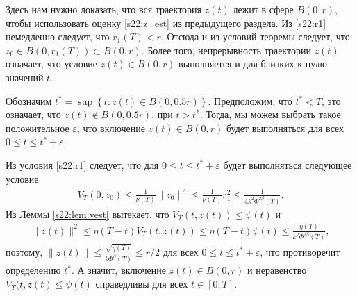 \documentclass[../main.tex]{subfiles}
\begin{document}
Здесь нам нужно доказать, что вся траектория $z(t)$ лежит в сфере $B(0,r)$, чтобы использовать оценку \eqref{s22:z_est} из предыдущего раздела. 
Из \eqref{s22:r1} немедленно следует, что $r_1(T) < r$. 
Отсюда и из условий теоремы следует, что $z_0 \in B(0,r_1(T)) \subset B(0,r) $. 
Более того, непрерывность траектории $z(t)$ означает, что условие $z(t) \in B(0,r) $ выполняется и для близких к нулю значений $t$. 

Обозначим $t^* = \sup \left\{ t: z(t) \in B\left(0,0.5r\right)\right\} $.
Предположим, что $t^* < T$, это означает, что $z(t) \notin B(0,0.5r)$, при $t > t^*$. 
Тогда, мы можем выбрать такое положительное $ \varepsilon$, что включение $z(t) \in B(0,r)$ будет выполняться для всех $0 \leqslant t \leqslant t^* + \varepsilon$. 

Из условия \eqref{s22:r1} следует, что для $0 \leqslant t \leqslant t^* + \varepsilon$ будет выполняться следующее условие
\begin{gather*}
 V_T(0,z_0) \leqslant \frac{1}{\nu(T)} \|z_0\|^2 \leqslant \frac{1}{\nu(T)} r_1^2 \leqslant \frac{1}{4k^2\Phi^{2\beta}(T)}.
\end{gather*}
Из Леммы \ref{s22:lem:vest} вытекает, что 
$V_T(t, z(t)) \leqslant \psi(t) $ и
\begin{gather}\label{s22:z_est}
 \|z(t)\|^2 \leqslant \eta(T-t) V_T(t,z(t)) \leqslant \eta(T-t) \psi(t) \leqslant \frac{\eta(T)}{k^2\Phi^{2\beta}(T)},
\end{gather}
поэтому, $\|z(t)\| \leqslant \frac{\sqrt{\eta(T)}}{k\Phi^\beta(T)} \leqslant r/2$ для всех $0\leqslant t \leqslant t^*+\varepsilon$,
что противоречит определению $t^*$. 
А значит, включение $z(t) \in B(0,r) $ и неравенство $V_T(t,z(t)\leqslant \psi(t)$ справедливы для всех $t \in [0; T]$.
 
\end{document}
